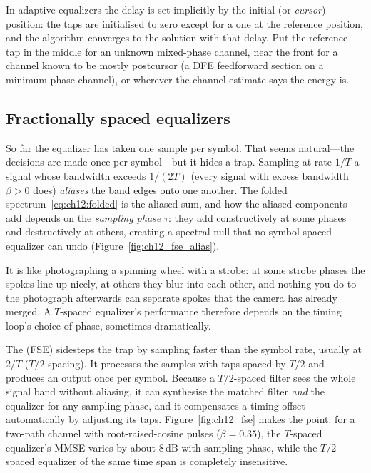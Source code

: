In adaptive equalizers the delay is set implicitly by the initial  (or
\emph{cursor}) position: the taps are initialised to zero except for a one at the reference
position, and the algorithm converges to the solution with that delay. Put the reference tap in
the middle for an unknown mixed-phase channel, near the front for a channel known to be mostly
postcursor (a DFE feedforward section on a minimum-phase channel), or wherever the channel
estimate says the energy is.


\subsection{Fractionally spaced equalizers}

So far the equalizer has taken one sample per symbol. That seems natural---the decisions are made
once per symbol---but it hides a trap. Sampling at rate $1/T$ a signal whose bandwidth exceeds
$1/(2T)$ (every signal with excess bandwidth $\beta>0$ does) \emph{aliases} the band edges onto
one another. The folded spectrum~\eqref{eq:ch12:folded} is the aliased sum, and how the aliased
components add depends on the \emph{sampling phase} $\tau$: they add constructively at some phases
and destructively at others, creating a spectral null that no symbol-spaced equalizer can undo
(Figure~\ref{fig:ch12_fse_alias}).

It is like photographing a spinning wheel with a strobe: at some strobe phases the spokes line up
nicely, at others they blur into each other, and nothing you do to the photograph afterwards can
separate spokes that the camera has already merged. A $T$-spaced equalizer's performance therefore
depends on the timing loop's choice of phase, sometimes dramatically.

The  (FSE) sidesteps the trap by sampling faster than the
symbol rate, usually at $2/T$ ($T/2$ spacing). It processes the samples with taps spaced by $T/2$
and produces an output once per symbol. Because a $T/2$-spaced filter sees the whole signal band
without aliasing, it can synthesise the matched filter \emph{and} the equalizer for any sampling
phase, and it compensates a timing offset automatically by adjusting its taps.
Figure~\ref{fig:ch12_fse} makes the point: for a two-path channel with root-raised-cosine pulses
($\beta=0.35$), the $T$-spaced equalizer's MMSE varies by about 8\,dB with sampling phase, while the
$T/2$-spaced equalizer of the same time span is completely insensitive.

